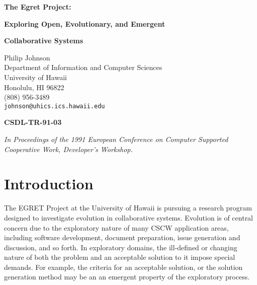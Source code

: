 

\pagestyle{empty}

\begin{center}
{\Large\bf The Egret Project:}

{\Large\bf Exploring Open, Evolutionary, and Emergent}

{\Large\bf Collaborative Systems}

\bigskip

Philip Johnson\\
Department of Information and Computer Sciences\\
University of Hawaii\\
Honolulu, HI 96822\\
(808) 956-3489\\
{\tt johnson@uhics.ics.hawaii.edu}

\bigskip

{\bf CSDL-TR-91-03}

\bigskip

{\em In Proceedings of the 1991 European Conference on Computer
Supported Cooperative Work, Developer's Workshop.}

\end{center}

\section*{Introduction}

The EGRET Project at the University of Hawaii is pursuing a research
program designed to investigate evolution in collaborative systems.
Evolution is of central concern due to the exploratory nature of many
CSCW application areas, including software development, document
preparation, issue generation and discussion, and so forth.  In
exploratory domains, the ill-defined or changing nature of both the
problem and an acceptable solution to it impose special demands.  For
example, the criteria for an acceptable solution, or the solution
generation method may be an an emergent property of the exploratory
process.

